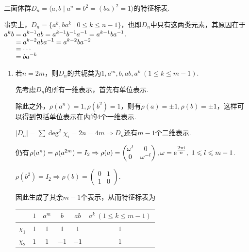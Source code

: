 \begin{instance}
    二面体群$D_n = \langle a, b \mid a^n = b^2 = (ba)^2 = 1 \rangle$的特征标表.\par
    事实上，$D_n = \{a^k, ba^k \mid 0 \leqslant k \leqslant n-1\}$，也即$D_n$中只有这两类元素，其原因在于$\setjot[-2]\begin{aligned}[t]
        a^k b &= a^{k-1} a b = a^{k-1} b^{-1} a^{-1}=a^{k-1}ba^{-1} \\
        &= a^{k-2} a b a^{-1} = a^{k-2} b a^{-2} \\
        &=\cdots \\
        &= b a^{-k}
    \end{aligned}$.\par
    \begin{enumerate}
        \item[①] 若$n=2m$，则$D_n$的共轭类为$1, a^m, b, ab, a^k\ (1 \leqslant k \leqslant m-1)$.\par
        先考虑$D_n$的所有一维表示，首先有单位表示.\par
        除此之外，$\rho(a^n) = 1, \rho(b^2) = 1$，则有$\rho(a) = \pm 1, \rho(b) = \pm 1$，这样可以得到包括单位表示在内的$4$个一维表示.\par
        $|D_n| = \sum \deg^2 \chi_i = 2n = 4m \Rightarrow D_n$还有$m-1$个二维表示.\par
        仍有$\rho(a^n) = \rho(a^{2m}) = I_2 \Rightarrow \rho(a) = \begin{pmatrix} \omega^l & 0 \\ 0 & \omega^{-l} \end{pmatrix}, \omega = \mathrm{e}^{\tfrac{2\pi \mathrm{i}}{n}},\ 1 \leqslant l \leqslant m-1$.\par
        $\rho(b^2) = I_2 \Rightarrow \rho(b) = \begin{pmatrix} 0 & 1 \\ 1 & 0 \end{pmatrix}$.\par
        因此生成了其余$m-1$个表示，从而特征标表为
        \begin{center}
            \begin{tabular}{c|ccccc}
                                                     & $1$ & $a^m$      & $b$  & $ab$ & $a^k\ (1 \leqslant k \leqslant m-1)$ \\ \hline
                $\chi_1$                             & $1$ & $1$        & $1$  & $1$  & $1$                                \\
                $\chi_2$                             & $1$ & $1$        & $-1$ & $-1$ & $1$                                \\

\end{tabular}
\end{center}
\end{enumerate}
\end{instance}
